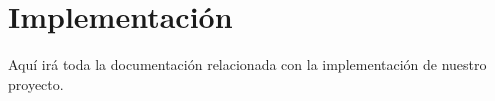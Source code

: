 \chapter{Implementación}
\label{cap:implementacion}

Aquí irá toda la documentación relacionada con la implementación de nuestro proyecto.


